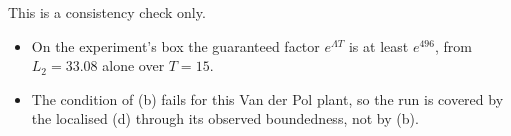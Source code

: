 This is a consistency check only.
\begin{itemize}
\item On the experiment's box the guaranteed factor $e^{\Lambda T}$ is at least $e^{496}$, from $L_2=33.08$ alone over
  $T=15$.
\item The condition of (b) fails for this Van der Pol plant, so the run is covered by the localised (d) through its
  observed boundedness, not by (b).
\end{itemize}

